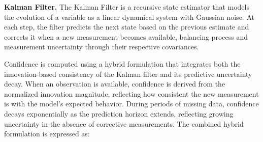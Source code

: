 \noindent\textbf{Kalman Filter.}  
The Kalman Filter is a recursive state estimator that models the evolution of a variable as a linear dynamical system with Gaussian noise.  
At each step, the filter predicts the next state based on the previous estimate and corrects it when a new measurement becomes available, balancing process and measurement uncertainty through their respective covariances.  







Confidence is computed using a hybrid formulation that integrates both the innovation-based consistency of the Kalman filter and its predictive uncertainty decay. 
When an observation is available, confidence is derived from the normalized innovation magnitude, reflecting how consistent the new measurement is with the model's expected behavior. 
During periods of missing data, confidence decays exponentially as the prediction horizon extends, reflecting growing uncertainty in the absence of corrective measurements. 
The combined hybrid formulation is expressed as:

